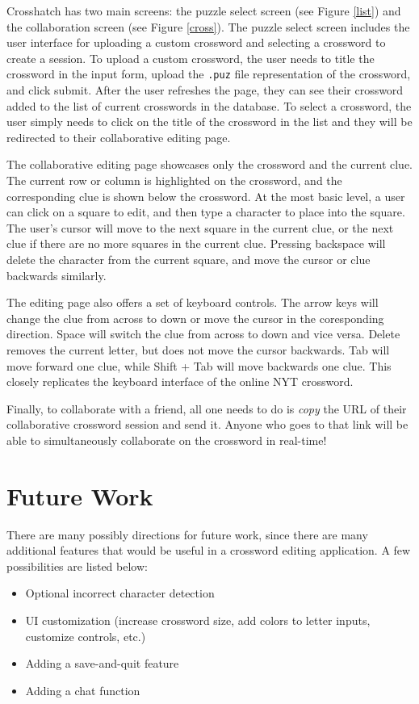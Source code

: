 \documentclass{article}
\begin{document}
Crosshatch has two main screens: the puzzle select screen (see Figure \ref{list}) and the collaboration screen (see Figure \ref{cross}). The puzzle select screen includes the user interface for uploading a custom crossword
and selecting a crossword to create a session. To upload a custom crossword, the user needs to title the crossword in the input form, upload the \texttt{.puz} file representation of the crossword,
and click submit. After the user refreshes the page, they can see their crossword added to the list of current crosswords in the database. To select a crossword,
the user simply needs to click on the title of the crossword in the list and they will be redirected to their collaborative editing page.

The collaborative editing page showcases only the crossword and the current clue. The current row or column is highlighted on the crossword, and the corresponding clue
is shown below the crossword. At the most basic level, a user can click on a square to edit, and then type a character to place into the square. The user's cursor will
move to the next square in the current clue, or the next clue if there are no more squares in the current clue. Pressing backspace will delete the character from the current square,
and move the cursor or clue backwards similarly.

The editing page also offers a set of keyboard controls. The arrow keys will change the clue from across to down or move the cursor in the coresponding direction. Space will
switch the clue from across to down and vice versa. Delete removes the current letter, but does not move the cursor backwards. Tab will move forward one clue,
while Shift + Tab will move backwards one clue. This closely replicates the keyboard interface of the online NYT crossword.

Finally, to collaborate with a friend, all one needs to do is \textit{copy} the URL of their collaborative crossword session and send it. Anyone who goes to that link will be able to simultaneously collaborate on the crossword in real-time!

\section{Future Work}
There are many possibly directions for future work, since there 
are many additional features that would be useful in a crossword editing application. 
A few possibilities are listed below:
\begin{itemize}
	\item Optional incorrect character detection
  	\item UI customization (increase crossword size, add colors to letter inputs, customize controls, etc.)
	\item Adding a save-and-quit feature
	\item Adding a chat function
\end{itemize}
\end{document}
